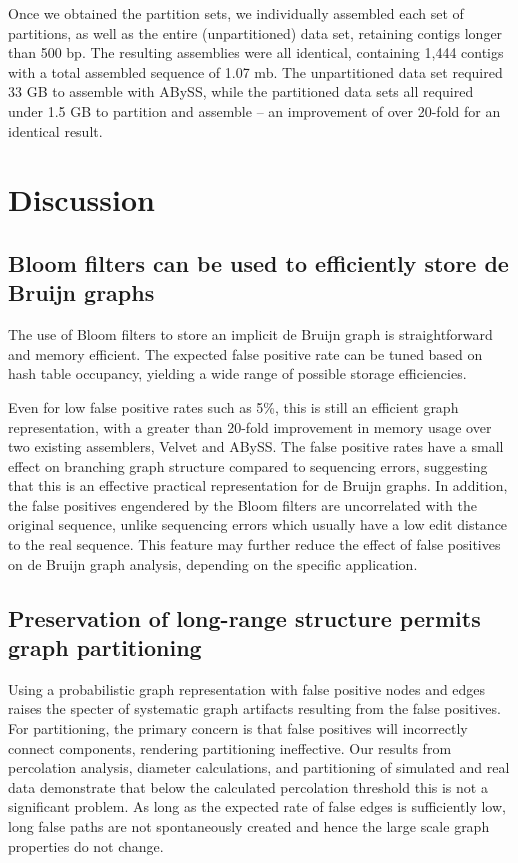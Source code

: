 \documentclass{pnastwo}
\begin{document}
\begin{article}
Once we obtained the partition sets, we individually assembled each
set of partitions, as well as the entire (unpartitioned) data set,
retaining contigs longer than 500 bp.  The resulting assemblies were
all identical, containing 1,444 contigs with a total assembled
sequence of 1.07 mb.  The unpartitioned data set required 33 GB to
assemble with ABySS, while the partitioned data sets all required
under 1.5 GB to partition and assemble -- an improvement of over
20-fold for an identical result.


\section{Discussion}


\subsection{Bloom filters can be used to efficiently store de Bruijn graphs}

The use of Bloom filters to store an implicit de Bruijn graph is
straightforward and memory efficient.  The expected false positive
rate can be tuned based on hash table occupancy, yielding a wide range
of possible storage efficiencies.

Even for low false positive rates such as 5\%, this is still an
efficient graph representation, with a greater than 20-fold improvement
in memory usage over two existing assemblers, Velvet and ABySS.  The false
positive rates have a small effect on branching graph structure
compared to sequencing errors, suggesting that this is an effective
practical representation for de Bruijn graphs.  In addition, the false positives
engendered by the Bloom filters are uncorrelated with the original
sequence, unlike sequencing errors which usually have a low edit
distance to the real sequence.  This feature may further reduce the effect of
false positives on de Bruijn graph analysis, depending on the specific
application.

\subsection{Preservation of long-range structure permits graph partitioning}

Using a probabilistic graph representation with false positive nodes
and edges raises the specter of systematic graph artifacts resulting
from the false positives.  For partitioning, the primary concern is that false
positives will incorrectly connect components, rendering partitioning
ineffective.  Our results from percolation analysis, diameter
calculations, and partitioning of simulated and real data demonstrate that
below the calculated percolation threshold this is not a significant
problem.  As long as the expected rate of false edges is sufficiently
low, long false paths are not spontaneously created and hence the
large scale graph properties do not change.


\end{article}
\end{document}
